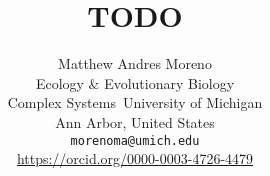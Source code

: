\title{ TODO }

\author{
Matthew Andres Moreno\\
Ecology \& Evolutionary Biology\\
Complex Systems\
University of Michigan\\
Ann Arbor, United States \\
\texttt{morenoma@umich.edu} \\
\url{https://orcid.org/0000-0003-4726-4479} \\
}

\maketitle
